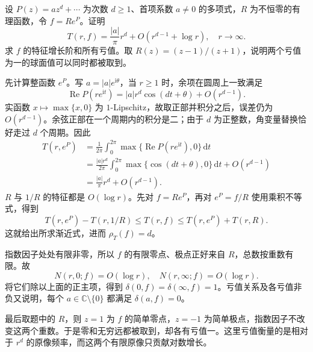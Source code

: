\begin{exercise}\label{b3:ex:C-2}
设 \(P(z)=az^d+\cdots\) 为次数 \(d\ge1\)、首项系数 \(a\ne0\) 的多项式，\(R\) 为不恒零的有理函数，令 \(f=Re^P\)。证明
\[
 T(r,f)=\frac{|a|}{\pi}r^d+O(r^{d-1}+\log r),\quad r\to\infty.
\]
求 \(f\) 的特征增长阶和所有亏值。取 \(R(z)=(z-1)/(z+1)\)，说明两个亏值为一的球面值可以同时都被取到。
\end{exercise}
\begin{solution}
先计算整函数 \(e^P\)。写 \(a=|a|e^{\mathrm{i}\theta}\)，当 \(r\ge1\) 时，余项在圆周上一致满足
\[
 \operatorname{Re}P(re^{\mathrm{i}t})
 =|a|r^d\cos(dt+\theta)+O(r^{d-1}).
\]
实函数 \(x\mapsto\max\{x,0\}\) 为 \(1\)-Lipschitz，故取正部并积分之后，误差仍为 \(O(r^{d-1})\)。余弦正部在一个周期内的积分是二；由于 \(d\) 为正整数，角变量替换恰好走过 \(d\) 个周期。因此
\[
 \begin{aligned}
 T(r,e^P)
 &=\frac1{2\pi}\int_0^{2\pi}
      \max\{\operatorname{Re}P(re^{\mathrm{i}t}),0\}\,\mathrm{d}t\\
 &=\frac{|a|r^d}{2\pi}\int_0^{2\pi}
      \max\{\cos(dt+\theta),0\}\,\mathrm{d}t+O(r^{d-1})\\
 &=\frac{|a|}{\pi}r^d+O(r^{d-1}).
 \end{aligned}
\]
\(R\) 与 \(1/R\) 的特征都是 \(O(\log r)\)。先对 \(f=Re^P\)，再对 \(e^P=f/R\) 使用乘积不等式，得到
\[
 T(r,e^P)-T(r,1/R)\le T(r,f)
 \le T(r,e^P)+T(r,R).
\]
这就给出所求渐近式，进而 \(\rho_T(f)=d\)。

指数因子处处有限非零，所以 \(f\) 的有限零点、极点正好来自 \(R\)，总数按重数有限。故
\[
 N(r,0;f)=O(\log r),
 \quad N(r,\infty;f)=O(\log r).
\]
将它们除以上面的正主项，得到 \(\delta(0,f)=\delta(\infty,f)=1\)。亏值关系及各亏值非负又说明，每个 \(a\in\mathbb C\setminus\{0\}\) 都满足 \(\delta(a,f)=0\)。

最后取题中的 \(R\)，则 \(z=1\) 为 \(f\) 的简单零点，\(z=-1\) 为简单极点，指数因子不改变这两个重数。于是零和无穷远都被取到，却各有亏值一。这里亏值衡量的是相对于 \(r^d\) 的原像频率，而这两个有限原像只贡献对数增长。
\end{solution}

